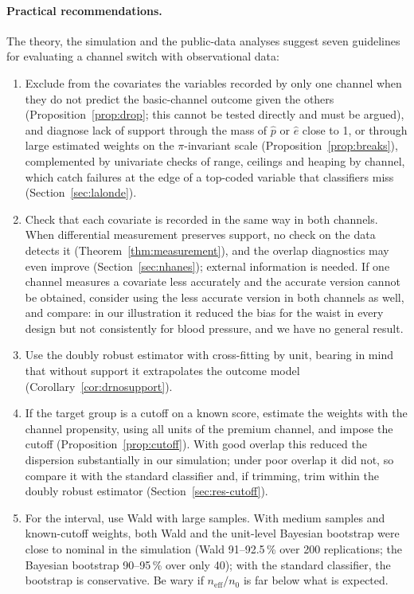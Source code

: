 \documentclass[twoside,11pt]{article}
\newcommand{\neff}{n_{\mathrm{eff}}}
\theoremstyle{plain}
\theoremstyle{definition}
\begin{document}
\paragraph{Practical recommendations.} The theory, the simulation and the public-data analyses suggest seven guidelines for evaluating a channel switch with observational data:
\begin{enumerate}
  \item Exclude from the covariates the variables recorded by only one channel when they do not predict the basic-channel outcome given the others (Proposition~\ref{prop:drop}; this cannot be tested directly and must be argued), and diagnose lack of support through the mass of $\hat p$ or $\hat e$ close to 1, or through large estimated weights on the $\pi$-invariant scale (Proposition~\ref{prop:breaks}), complemented by univariate checks of range, ceilings and heaping by channel, which catch failures at the edge of a top-coded variable that classifiers miss (Section~\ref{sec:lalonde}).
  \item Check that each covariate is recorded in the same way in both channels. When differential measurement preserves support, no check on the data detects it (Theorem~\ref{thm:measurement}), and the overlap diagnostics may even improve (Section~\ref{sec:nhanes}); external information is needed. If one channel measures a covariate less accurately and the accurate version cannot be obtained, consider using the less accurate version in both channels as well, and compare: in our illustration it reduced the bias for the waist in every design but not consistently for blood pressure, and we have no general result.
  \item Use the doubly robust estimator with cross-fitting by unit, bearing in mind that without support it extrapolates the outcome model (Corollary~\ref{cor:drnosupport}).
  \item If the target group is a cutoff on a known score, estimate the weights with the channel propensity, using all units of the premium channel, and impose the cutoff (Proposition~\ref{prop:cutoff}). With good overlap this reduced the dispersion substantially in our simulation; under poor overlap it did not, so compare it with the standard classifier and, if trimming, trim within the doubly robust estimator (Section~\ref{sec:res-cutoff}).
  \item For the interval, use Wald with large samples. With medium samples and known-cutoff weights, both Wald and the unit-level Bayesian bootstrap were close to nominal in the simulation (Wald 91--92.5\,\% over 200 replications; the Bayesian bootstrap 90--95\,\% over only 40); with the standard classifier, the bootstrap is conservative. Be wary if $\neff/n_0$ is far below what is expected.

\end{enumerate}
\end{document}
